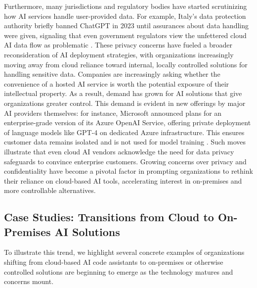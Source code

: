 Furthermore, many jurisdictions and regulatory bodies have started scrutinizing how \gls{AI} services handle user-provided data. For example, Italy’s data protection authority briefly banned ChatGPT in 2023 until assurances about data handling were given, signaling that even government regulators view the unfettered cloud \gls{AI} data flow as problematic \autocite{Reuters2023}. These privacy concerns have fueled a broader reconsideration of \gls{AI} deployment strategies, with organizations increasingly moving away from cloud reliance toward internal, locally controlled solutions for handling sensitive data. Companies are increasingly asking whether the convenience of a hosted \gls{AI} service is worth the potential exposure of their intellectual property. As a result, demand has grown for \gls{AI} solutions that give organizations greater control. This demand is evident in new offerings by major \gls{AI} providers themselves: for instance, Microsoft announced plans for an enterprise-grade version of its Azure OpenAI Service, offering private deployment of language models like GPT-4 on dedicated Azure infrastructure. This ensures customer data remains isolated and is not used for model training \autocite{MicrosoftAzureOpenAIPrivateDeployment}. Such moves illustrate that even cloud \gls{AI} vendors acknowledge the need for data privacy safeguards to convince enterprise customers. Growing concerns over privacy and confidentiality have become a pivotal factor in prompting organizations to rethink their reliance on cloud-based \gls{AI} tools, accelerating interest in on-premises and more controllable alternatives.

\subsection{Case Studies: Transitions from Cloud to On-Premises AI Solutions}
\label{sec:case-studies}
To illustrate this trend, we highlight several concrete examples of organizations shifting from cloud-based \gls{AI} code assistants to on-premises or otherwise controlled solutions are beginning to emerge as the technology matures and concerns mount.

